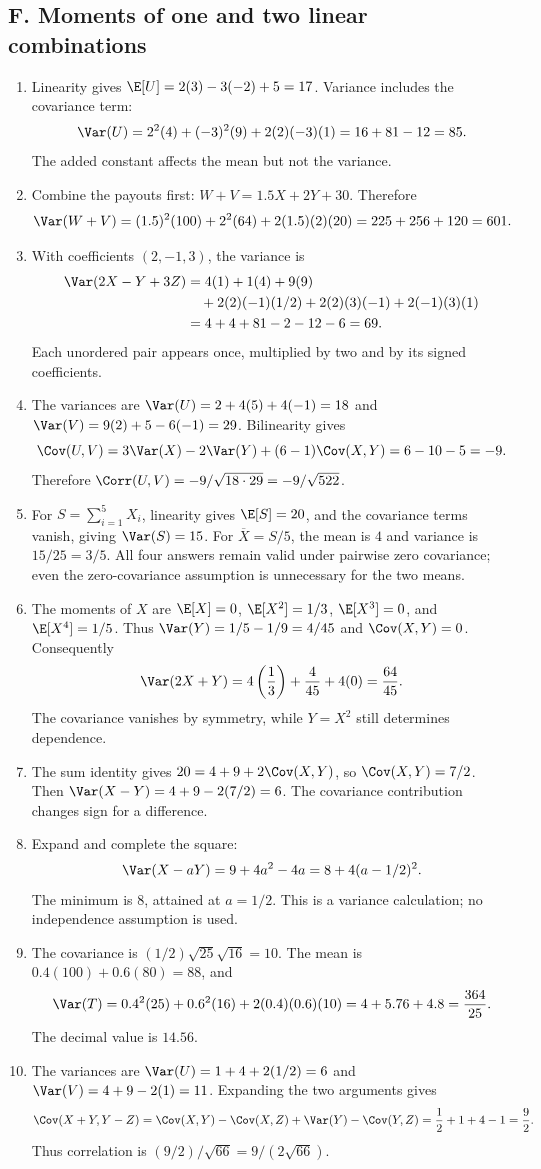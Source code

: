 \subsection{F. Moments of one and two linear combinations}
\begin{enumerate}[label=\textbf{F\arabic*.},leftmargin=*,itemsep=1em]
\item Linearity gives $\E[U]=2(3)-3(-2)+5=17$. Variance includes the covariance term:
\[
\Var(U)=2^2(4)+(-3)^2(9)+2(2)(-3)(1)=16+81-12=85.
\]
The added constant affects the mean but not the variance.
\item Combine the payouts first: $W+V=1.5X+2Y+30$. Therefore
\[
\Var(W+V)=(1.5)^2(100)+2^2(64)+2(1.5)(2)(20)
=225+256+120=601.
\]
\item With coefficients $(2,-1,3)$, the variance is
\begin{align*}
\Var(2X-Y+3Z)
&=4(1)+1(4)+9(9)\\
&\quad+2(2)(-1)(1/2)+2(2)(3)(-1)+2(-1)(3)(1)\\
&=4+4+81-2-12-6=69.
\end{align*}
Each unordered pair appears once, multiplied by two and by its signed coefficients.
\item The variances are $\Var(U)=2+4(5)+4(-1)=18$ and $\Var(V)=9(2)+5-6(-1)=29$. Bilinearity gives
\[
\Cov(U,V)=3\Var(X)-2\Var(Y)+(6-1)\Cov(X,Y)
=6-10-5=-9.
\]
Therefore $\Corr(U,V)=-9/\sqrt{18\cdot29}=-9/\sqrt{522}$.
\item For $S=\sum_{i=1}^5X_i$, linearity gives $\E[S]=20$, and the covariance terms vanish, giving $\Var(S)=15$. For $\overline X=S/5$, the mean is $4$ and variance is $15/25=3/5$. All four answers remain valid under pairwise zero covariance; even the zero-covariance assumption is unnecessary for the two means.
\item The moments of $X$ are $\E[X]=0$, $\E[X^2]=1/3$, $\E[X^3]=0$, and $\E[X^4]=1/5$. Thus $\Var(Y)=1/5-1/9=4/45$ and $\Cov(X,Y)=0$. Consequently
\[
\Var(2X+Y)=4\left(\frac13\right)+\frac4{45}+4(0)=\frac{64}{45}.
\]
The covariance vanishes by symmetry, while $Y=X^2$ still determines dependence.
\item The sum identity gives $20=4+9+2\Cov(X,Y)$, so $\Cov(X,Y)=7/2$. Then $\Var(X-Y)=4+9-2(7/2)=6$. The covariance contribution changes sign for a difference.
\item Expand and complete the square:
\[
\Var(X-aY)=9+4a^2-4a=8+4(a-1/2)^2.
\]
The minimum is $8$, attained at $a=1/2$. This is a variance calculation; no independence assumption is used.
\item The covariance is $(1/2)\sqrt{25}\sqrt{16}=10$. The mean is $0.4(100)+0.6(80)=88$, and
\[
\Var(T)=0.4^2(25)+0.6^2(16)+2(0.4)(0.6)(10)
=4+5.76+4.8=\frac{364}{25}.
\]
The decimal value is $14.56$.
\item The variances are $\Var(U)=1+4+2(1/2)=6$ and $\Var(V)=4+9-2(1)=11$. Expanding the two arguments gives
\[
\Cov(X+Y,Y-Z)=\Cov(X,Y)-\Cov(X,Z)+\Var(Y)-\Cov(Y,Z)
=\frac12+1+4-1=\frac92.
\]
Thus correlation is $(9/2)/\sqrt{66}=9/(2\sqrt{66})$.
\end{enumerate}


